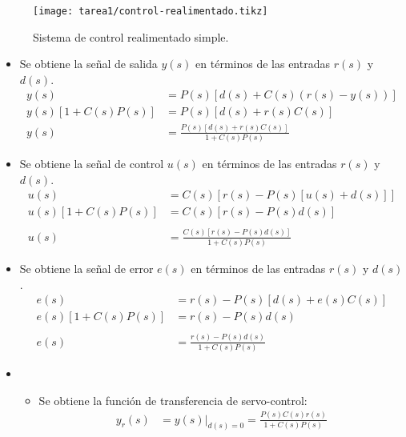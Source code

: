   \begin{ejercicio}
    \begin{figure}[H]
        \centering
        \texttt{[image: tarea1/control-realimentado.tikz]}
        \caption{Sistema de control realimentado simple.}
        \label{img:ejercicio1}
    \end{figure}
  \end{ejercicio}
  \begin{itemize}
    \item 
    Se obtiene la señal de salida $y(s)$ en términos de las entradas $r(s)$ y $d(s)$.
    \begin{align*}
      y(s) &= P(s) \left[ d(s) + C(s) \left( r(s) - y(s) \right) \right]
      \\
      y(s) \left[ 1 + C(s) P(s) \right] &= P(s) \left[ d(s) + r(s) C(s) \right]
      \\
      y(s) &= \frac{P(s) \left[ d(s) + r(s) C(s) \right]}{1 + C(s) P(s)}
    \end{align*}

    \item
    Se obtiene la señal de control $u(s)$ en términos de las entradas $r(s)$ y $d(s)$.
    \begin{align*}
      u(s) &= C(s) \left[ r(s) - P(s) \left[ u(s) + d(s) \right] \right]
      \\
      u(s) \left[ 1 + C(s) P(s) \right] &= C(s) \left[ r(s) - P(s) d(s) \right]
      \\ \\
      u(s) &= \frac{C(s) \left[ r(s) - P(s) d(s) \right]}{1 + C(s) P(s)}
    \end{align*}

    \item
    Se obtiene la señal de error $e(s)$ en términos de las entradas $r(s)$ y $d(s)$.
    \begin{align*}
      e(s) &= r(s) - P(s) \left[ d(s) + e(s) C(s) \right]
      \\
      e(s) \left[ 1 + C(s) P(s) \right] &= r(s) - P(s) d(s)
      \\ \\
      e(s) &= \frac{r(s) - P(s) d(s)}{1 + C(s) P(s)}
    \end{align*}

    \item
    \begin{itemize}

      \item 
      Se obtiene la función de transferencia de servo-control:
      \begin{align*}
        y_{r}(s) &= y(s)|_{d(s)=0} = \frac{P(s) C(s) r(s)}{1 + C(s) P(s)}
      \end{align*}


\end{itemize}
\end{itemize}
